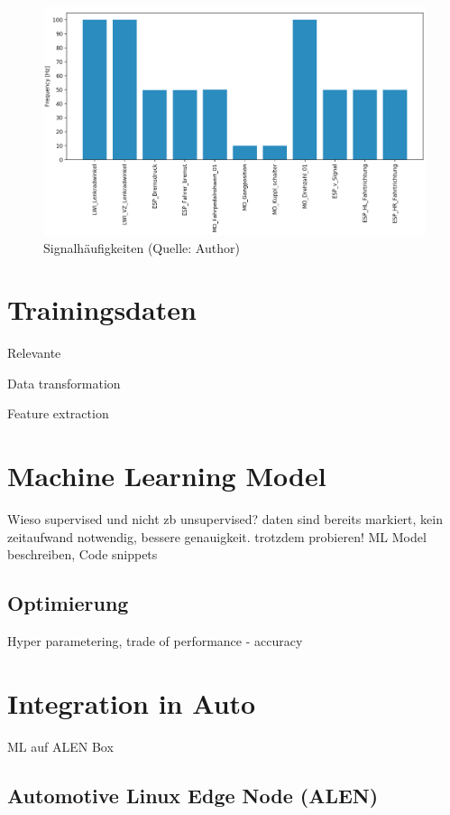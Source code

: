 \begin{figure}[htbp]
	\centering
		\includegraphics[width=\textwidth]{images/signal_frequences.png}
	\caption{Signalhäufigkeiten (Quelle: Author)}
	\label{fig:signal_freq}
\end{figure}

\section{Trainingsdaten}
\label{sec:train_data}

Relevante

Data transformation

Feature extraction

\section{Machine Learning Model}
\label{sec:ml_implementation}

Wieso supervised und nicht zb unsupervised? daten sind bereits markiert, kein zeitaufwand notwendig, bessere genauigkeit. trotzdem probieren! ML Model beschreiben, Code snippets

\subsection{Optimierung}
\label{sec:ml_optimization}

Hyper parametering, trade of performance - accuracy

\section{Integration in Auto}
\label{sec:car_integration}

ML auf ALEN Box

\subsection{Automotive Linux Edge Node (ALEN)}
\label{sec:alen}